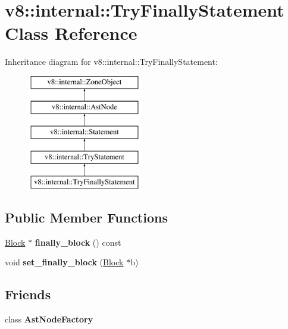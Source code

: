 \hypertarget{classv8_1_1internal_1_1TryFinallyStatement}{}\section{v8\+:\+:internal\+:\+:Try\+Finally\+Statement Class Reference}
\label{classv8_1_1internal_1_1TryFinallyStatement}
Inheritance diagram for v8\+:\+:internal\+:\+:Try\+Finally\+Statement\+:\begin{figure}[H]
\begin{center}
\leavevmode
\includegraphics[height=5.000000cm]{classv8_1_1internal_1_1TryFinallyStatement}
\end{center}
\end{figure}
\subsection*{Public Member Functions}
\begin{DoxyCompactItemize}
\item 
\mbox{\label{classv8_1_1internal_1_1TryFinallyStatement_afd9a48081777baf1f2f45b83f7dab1aa}} 
\mbox{\hyperlink{classv8_1_1internal_1_1Block}{Block}} $\ast$ {\bfseries finally\+\_\+block} () const
\item 
\mbox{\label{classv8_1_1internal_1_1TryFinallyStatement_af82e701389c0de379fd650128ad3f160}} 
void {\bfseries set\+\_\+finally\+\_\+block} (\mbox{\hyperlink{classv8_1_1internal_1_1Block}{Block}} $\ast$b)
\end{DoxyCompactItemize}
\subsection*{Friends}
\begin{DoxyCompactItemize}
\item 
\mbox{\label{classv8_1_1internal_1_1TryFinallyStatement_a8d587c8ad3515ff6433eb83c578e795f}} 
class {\bfseries Ast\+Node\+Factory}
\end{DoxyCompactItemize}
